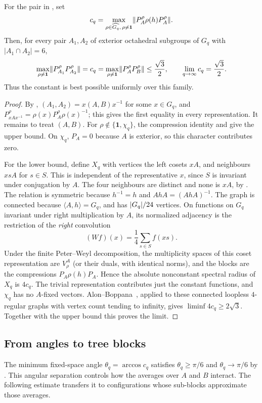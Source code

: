 \begin{theorem}
\label{thm:octahedral-sharp}
For the pair in , set
\[
 c_q=\max_{\rho\in\widehat{G_q},\,\rho\ne\mathbf1}
          \lVert P_A^\rho\rho(h)P_A^\rho \rVert.
\]
Then, for every pair $A_1,A_2$ of exterior octahedral subgroups of $G_q$
with $|A_1\cap A_2|=6$,
\[
 \max_{\rho\ne\mathbf1}\lVert P_{A_1}^\rho P_{A_2}^\rho \rVert
 =c_q=\max_{\rho\ne\mathbf1}\lVert P_A^\rho P_B^\rho \rVert\le\frac{\sqrt3}{2},
 \qquad
 \lim_{q\to\infty}c_q
       =\frac{\sqrt3}{2}.
\]
Thus the constant is best possible uniformly over this family.
\end{theorem}
\begin{proof}
By , $(A_1,A_2)=x(A,B)x^{-1}$ for some
$x\in G_q$, and $P_{xAx^{-1}}^\rho=\rho(x)P_A^\rho\rho(x)^{-1}$; this
gives the first equality in every representation. It remains to treat
$(A,B)$. For $\rho\notin\{\mathbf1,\chi_q\}$, the compression identity and
 give the upper bound. On $\chi_q$,
$P_A=0$ because $A$ is exterior, so this character contributes zero.

For the lower bound, define $X_q$ with vertices the left cosets $xA$,
and neighbours $xsA$ for $s\in S$. This is independent of the
representative $x$, since $S$ is invariant under conjugation by $A$.
The four neighbours are distinct and none is $xA$, by
. The relation is symmetric because
$h^{-1}=h$ and $AhA=(AhA)^{-1}$. The graph is connected because
$\langle A,h\rangle=G_q$, and has $\lvert G_q \rvert/24$ vertices.
On functions on $G_q$ invariant under right multiplication by $A$,
its normalized adjacency is the restriction of the \emph{right}
convolution
\[
 (Wf)(x)=\frac14\sum_{s\in S}f(xs).
\]
Under the finite Peter--Weyl decomposition, the multiplicity spaces of
this coset representation are $V_\rho^A$ (or their duals, with identical
norms), and the blocks are the compressions
$P_A\rho(h)P_A$. Hence the absolute nonconstant spectral radius of
$X_q$ is $4c_q$. The trivial representation contributes just the
constant functions, and $\chi_q$ has no $A$-fixed vectors.
Alon--Boppana~\cite[Theorem 1.3.1]{DSV2003}, applied to these connected
loopless $4$-regular graphs with vertex count tending to infinity,
gives $\liminf 4c_q\ge2\sqrt3$. Together with the upper bound this
proves the limit.
\end{proof}

\subsection{From angles to tree blocks}
The minimum fixed-space angle $\theta_q=\arccos c_q$ satisfies
$\theta_q\ge\pi/6$ and $\theta_q\to\pi/6$ by
. This angular separation controls how the
averages over $A$ and $B$ interact. The following estimate transfers it
to configurations whose sub-blocks approximate those averages.

